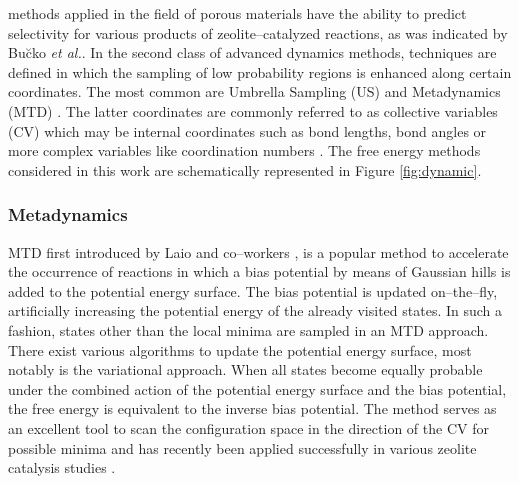 methods applied in the field of porous materials 
have the ability to predict selectivity for various products of
zeolite--catalyzed reactions, as was indicated by Bu\u{c}ko \textit{et
al.}\cite{Bucko2009}. 
In the second class of advanced dynamics methods, techniques are defined in
which the sampling of low probability regions is enhanced along certain coordinates. The most common are
Umbrella Sampling (US)\cite{Patey1975, Torrie1977} and Metadynamics
(MTD) \cite{Laio2002}. The latter coordinates are commonly referred to as
collective variables (CV) which may be internal coordinates such as bond lengths, bond angles or more complex variables like coordination
numbers \cite{Rohrdanz2013}. The free energy methods considered in this work are
schematically represented in Figure \ref{fig:dynamic}. 


\subsubsection*{Metadynamics}
MTD first introduced by Laio and co--workers \cite{Laio2002}, is a popular
method to accelerate the occurrence of reactions in which a bias potential by means of Gaussian hills
is added to the potential energy surface. The bias potential is updated
on--the--fly, artificially increasing the potential energy of the already
visited states.
In such a fashion, states other than the local minima are sampled in an MTD
approach. There exist various algorithms to update the potential energy surface, most notably is the variational approach.
When all states become equally probable under the combined action of the potential energy surface and the bias potential, 
the free energy is equivalent to the inverse bias potential. The method serves
as an excellent tool to scan the configuration space in the direction of the
CV for possible minima and has recently been applied
successfully in various zeolite catalysis studies \cite{DeWispelaere2015,
DeWispelaere2016}.

